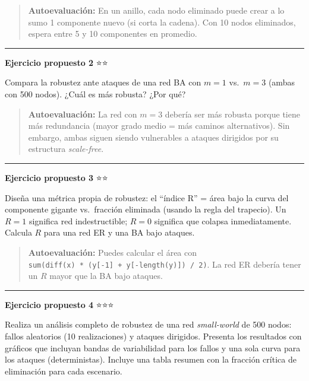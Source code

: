 \documentclass[
  letterpaper,
  DIV=11,
  numbers=noendperiod]{scrreprt}
\begin{document}
\begin{quote}
\textbf{Autoevaluación:} En un anillo, cada nodo eliminado puede crear a
lo sumo 1 componente nuevo (si corta la cadena). Con 10 nodos
eliminados, espera entre 5 y 10 componentes en promedio.
\end{quote}

\begin{center}\rule{0.5\linewidth}{0.5pt}\end{center}

\textbf{Ejercicio propuesto 2} ⭐⭐

Compara la robustez ante ataques de una red BA con \(m = 1\)
vs.~\(m = 3\) (ambas con 500 nodos). ¿Cuál es más robusta? ¿Por qué?

\begin{quote}
\textbf{Autoevaluación:} La red con \(m = 3\) debería ser más robusta
porque tiene más redundancia (mayor grado medio = más caminos
alternativos). Sin embargo, ambas siguen siendo vulnerables a ataques
dirigidos por su estructura \emph{scale-free}.
\end{quote}

\begin{center}\rule{0.5\linewidth}{0.5pt}\end{center}

\textbf{Ejercicio propuesto 3} ⭐⭐

Diseña una métrica propia de robustez: el ``índice R'' = área bajo la
curva del componente gigante vs.~fracción eliminada (usando la regla del
trapecio). Un \(R = 1\) significa red indestructible; \(R = 0\)
significa que colapsa inmediatamente. Calcula \(R\) para una red ER y
una BA bajo ataques.

\begin{quote}
\textbf{Autoevaluación:} Puedes calcular el área con
\texttt{sum(diff(x)\ *\ (y{[}-1{]}\ +\ y{[}-length(y){]})\ /\ 2)}. La
red ER debería tener un \(R\) mayor que la BA bajo ataques.
\end{quote}

\begin{center}\rule{0.5\linewidth}{0.5pt}\end{center}

\textbf{Ejercicio propuesto 4} ⭐⭐⭐

Realiza un análisis completo de robustez de una red \emph{small-world}
de 500 nodos: fallos aleatorios (10 realizaciones) y ataques dirigidos.
Presenta los resultados con gráficos que incluyan bandas de variabilidad
para los fallos y una sola curva para los ataques (deterministas).
Incluye una tabla resumen con la fracción crítica de eliminación para
cada escenario.
\end{document}
